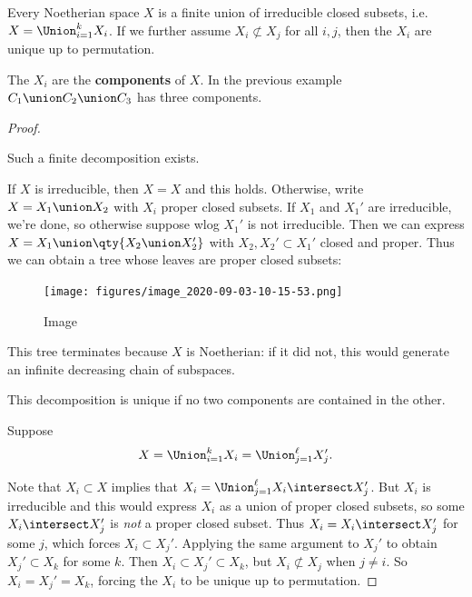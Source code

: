 \begin{proposition}

Every Noetherian space \(X\) is a finite union of irreducible closed
subsets, i.e.~\(X = \Union_{i=1}^k X_i\). If we further assume
\(X_i \not\subset X_j\) for all \(i, j\), then the \(X_i\) are unique up
to permutation.

\end{proposition}

\begin{remark}

The \(X_i\) are the \textbf{components} of \(X\). In the previous
example \(C_1 \union C_2 \union C_3\) has three components.

\end{remark}

\begin{proof}

\begin{claim}

Such a finite decomposition exists.

\end{claim}

If \(X\) is irreducible, then \(X=X\) and this holds. Otherwise, write
\(X = X_1 \union X_2\) with \(X_i\) proper closed subsets. If \(X_1\)
and \(X_1'\) are irreducible, we're done, so otherwise suppose wlog
\(X_1'\) is not irreducible. Then we can express
\(X = X_1 \union \qty{X_2 \union X_2'}\) with \(X_2, X_2' \subset X_1'\)
closed and proper. Thus we can obtain a tree whose leaves are proper
closed subsets:

\begin{figure}
\centering
\texttt{[image: figures/image\_2020-09-03-10-15-53.png]}
\caption{Image}
\end{figure}

This tree terminates because \(X\) is Noetherian: if it did not, this
would generate an infinite decreasing chain of subspaces.

\begin{claim}

This decomposition is unique if no two components are contained in the
other.

\end{claim}

Suppose
\begin{align*}  
X= \Union_{i=1}^k X_i = \Union_{j=1}^\ell X_j'
.\end{align*}

Note that \(X_i \subset X\) implies that
\(X_i = \Union_{j=1}^\ell X_i \intersect X_j'\). But \(X_i\) is
irreducible and this would express \(X_i\) as a union of proper closed
subsets, so some \(X_i \intersect X_j'\) is \emph{not} a proper closed
subset. Thus \(X_i = X_i \intersect X_j'\) for some \(j\), which forces
\(X_i \subset X_j'\). Applying the same argument to \(X_j'\) to obtain
\(X_j' \subset X_k\) for some \(k\). Then
\(X_i \subset X_j' \subset X_k\), but \(X_ i \not\subset X_j\) when
\(j\neq i\). So \(X_i = X_j' = X_k\), forcing the \(X_i\) to be unique
up to permutation.

\end{proof}

